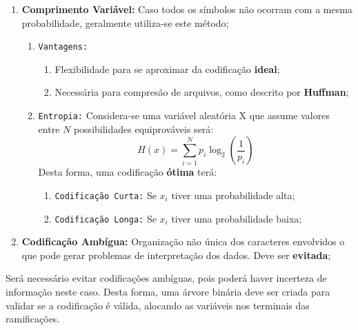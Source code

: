 \documentclass{article}
\begin{document}
\begin{enumerate}[rightmargin = \leftmargin]
                    \item \textbf{Comprimento Variável:} Caso todos os símbolos não ocorram com a mesma probabilidade, geralmente utiliza-se este método;
                        \begin{enumerate}[noitemsep, rightmargin = \leftmargin]
                            \item \texttt{Vantagens:}
                                \begin{enumerate}[noitemsep, rightmargin = \leftmargin]
                                    \item Flexibilidade para se aproximar da codificação \textbf{ideal};
                                    \item Necessária para compresão de arquivos, como descrito por \textbf{Huffman};
                                \end{enumerate}

                            \item \texttt{Entropia:} Considera-se uma variável aleatória X que assume valores entre $N$ possibilidades equiprováveis será:
                                \begin{equation}
                                    \boxed{
                                        H(x) = \sum_{i=1}^{N}p_{i}\log_{2}\left(\frac{1}{p_{i}}\right)
                                    }
                                \end{equation}
                            Desta forma, uma codificação \textbf{ótima} terá:
                                \begin{enumerate}[noitemsep, rightmargin = \leftmargin]
                                    \item \texttt{Codificação Curta:} Se $x_{i}$ tiver uma probabilidade alta;
                                    \item \texttt{Codificação Longa:} Se $x_{i}$ tiver uma probabilidade baixa;
                                \end{enumerate}
                        \end{enumerate}

                    \item \textbf{Codificação Ambígua:} Organização não única dos caracteres envolvidos o que pode gerar problemas de interpretação dos dados. Deve ser \textbf{evitada};

                \end{enumerate}
            Será necessário evitar codificações ambíguas, pois poderá haver incerteza de informação neste caso. Desta forma, uma árvore binária deve ser criada para validar se a codificação é válida, alocando as variáveis nos terminais das ramificações.
\end{document}
